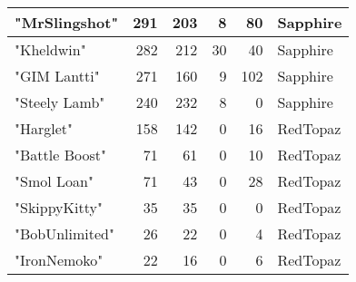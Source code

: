 \documentclass{article}
\begin{document}
\begin{table}[htbp]
\begin{tabular}{|l|r|r|r|r|l|}
"MrSlingshot" & 291 & 203 & 8 & 80 & Sapphire \\ \hline
"Kheldwin" & 282 & 212 & 30 & 40 & Sapphire \\ \hline
"GIM Lantti" & 271 & 160 & 9 & 102 & Sapphire \\ \hline
"Steely Lamb" & 240 & 232 & 8 & 0 & Sapphire \\ \hline
"Harglet" & 158 & 142 & 0 & 16 & RedTopaz \\ \hline
"Battle Boost" & 71 & 61 & 0 & 10 & RedTopaz \\ \hline
"Smol Loan" & 71 & 43 & 0 & 28 & RedTopaz \\ \hline
"SkippyKitty" & 35 & 35 & 0 & 0 & RedTopaz \\ \hline
"BobUnlimited" & 26 & 22 & 0 & 4 & RedTopaz \\ \hline
"IronNemoko" & 22 & 16 & 0 & 6 & RedTopaz \\ \hline
\end{tabular}
\end{table}
\end{document}
